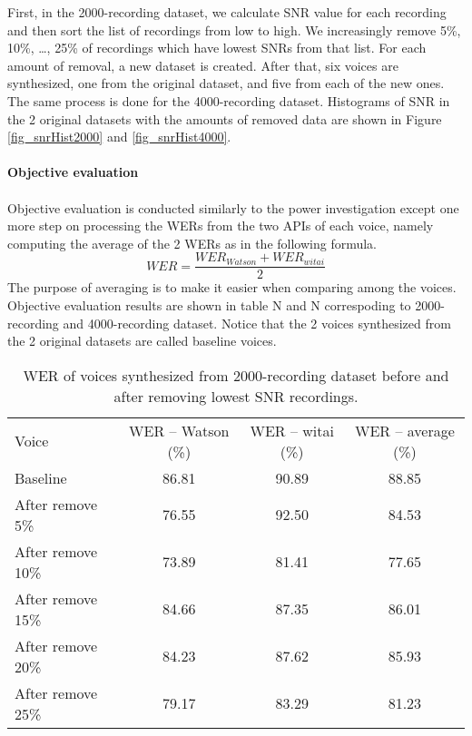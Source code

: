\documentclass[12pt]{article}
\begin{document}
First, in the 2000-recording dataset, we calculate SNR value for each recording and then sort the list of recordings from low to high. We increasingly remove 5\%, 10\%, …, 25\% of recordings which have lowest SNRs from that list. For each amount of removal, a new dataset is created. After that, six voices are synthesized, one from the original dataset, and five from each of the new ones. The same process is done for the 4000-recording dataset. Histograms of SNR in the 2 original datasets with the amounts of removed data are shown in Figure \ref{fig_snrHist2000} and \ref{fig_snrHist4000}.\\\\
\textbf{Objective evaluation}\\\\
Objective evaluation is conducted similarly to the power investigation except one more step on processing the WERs from the two APIs of each voice, namely computing the average of the 2 WERs as in the following formula.
\begin{equation}\label{exp_averageWer}
    WER = \frac{WER_{Watson} + WER_{witai}}{2}
\end{equation}
The purpose of averaging is to make it easier when comparing among the voices. Objective evaluation results are shown in table N and N correspoding to 2000-recording and 4000-recording dataset. Notice that the 2 voices synthesized from the 2 original datasets are called baseline voices.

\begin{table}[]
\begin{center}
\caption{WER of voices synthesized from 2000-recording dataset before and after removing lowest SNR recordings.}
\label{tab_werSnr2000}
\vspace{3mm}
\begin{tabular}{lccc}
\hline
Voice & WER – Watson (\%) & WER – witai (\%) & WER – average (\%)\\
\cmidrule(l{0pt}r{2pt}){1-1}\cmidrule(l{0pt}r{2pt}){2-2}\cmidrule(l{0pt}r{2pt}){3-3}\cmidrule(l{0pt}r{2pt}){4-4}
Baseline          & 86.81 & 90.89 & 88.85 \\
After remove 5\%  & 76.55 &	92.50 & 84.53 \\
After remove 10\% & 73.89 & 81.41 & 77.65 \\
After remove 15\% & 84.66 & 87.35 & 86.01 \\
After remove 20\% & 84.23 & 87.62 & 85.93 \\
After remove 25\% & 79.17 & 83.29 & 81.23 \\
\hline
\end{tabular}
\end{center}
\end{table}
\end{document}

